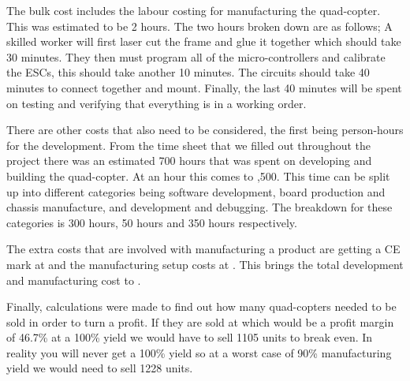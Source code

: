 \documentclass[a4paper,11pt]{article}
\begin{document}
\newline
The bulk cost includes the labour costing for manufacturing the quad-copter. This was estimated to be 2 hours. The two hours broken down are as follows; A skilled worker will first laser cut the frame and glue it together which should take 30 minutes. They then must program all of the micro-controllers and calibrate the ESCs, this should take another 10 minutes. The circuits should take 40 minutes to connect together and mount. Finally, the last 40 minutes will be spent on testing and verifying that everything is in a working order.  

There are other costs that also need to be considered, the first being person-hours for the development. From the time sheet that we filled out throughout the project there was an estimated 700 hours that was spent on developing and building the quad-copter. At  an hour this comes to ,500. This time can be split up into different categories being software development, board production and chassis manufacture, and development and debugging. The breakdown for these categories is 300 hours, 50 hours and 350 hours respectively. 

The extra costs that are involved with manufacturing a product are getting a CE mark at  and the manufacturing setup costs at .
This brings the total development and manufacturing cost to .

Finally, calculations were made to find out how many quad-copters needed to be sold in order to turn a profit. If they are sold at  which would be a profit margin of 46.7\% at a 100\% yield we would have to sell 1105 units to break even. In reality you will never get a 100\% yield so at a worst case of 90\% manufacturing yield we would need to sell 1228 units. 
\end{document}
